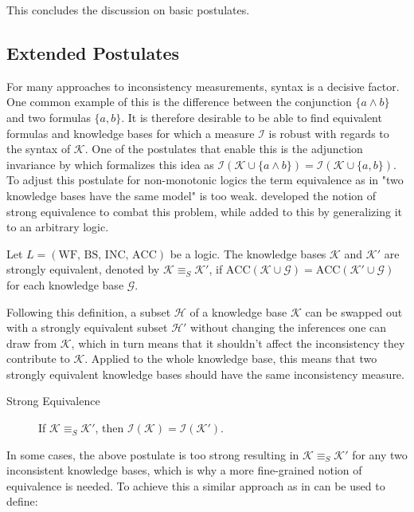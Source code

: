 This concludes the discussion on basic postulates.

\subsection{Extended Postulates}
For many approaches to inconsistency measurements, syntax is a decisive factor. One common example of this is the difference between the conjunction \(\{a \land b\}\) and two formulas \(\{a, b\}\). It is therefore desirable to be able to find equivalent formulas and knowledge bases for which a measure \(\mathcal{I}\) is robust with regards to the syntax of \(\mathcal{K}\). One of the postulates that enable this is the adjunction invariance by \cite{ferme_revisiting_2014} which formalizes this idea as \(\mathcal{I}(\mathcal{K} \cup \{a \land b\}) = \mathcal{I}(\mathcal{K} \cup \{a, b\})\).
To adjust this postulate for non-monotonic logics the term equivalence as in "two knowledge bases have the same model" is too weak. \cite{lifschitz_strongly_2001} developed the notion of strong equivalence to combat this problem, while \cite{brewka_strong_2019} added to this by generalizing it to an arbitrary logic.

\begin{definition}
    Let \(L = (\text{WF, BS, INC, ACC})\) be a logic. The knowledge bases \(\mathcal{K}\) and \(\mathcal{K}'\) are strongly equivalent, denoted by \(\mathcal{K} \equiv_S  \mathcal{K}'\), if \(\text{ACC}(\mathcal{K} \cup \mathcal{G}) = \text{ACC}(\mathcal{K}' \cup \mathcal{G})\) for each knowledge base \(\mathcal{G}\).
\end{definition}

Following this definition, a subset \(\mathcal{H}\) of a knowledge base \(\mathcal{K}\) can be swapped out with a strongly equivalent subset \(\mathcal{H}'\) without changing the inferences one can draw from \(\mathcal{K}\), which in turn means that it shouldn't affect the inconsistency they contribute to \(\mathcal{K}\). Applied to the whole knowledge base, this means that two strongly equivalent knowledge bases should have the same inconsistency measure.

\begin{description}
    \item[Strong Equivalence] If \(\mathcal{K} \equiv_S \mathcal{K}'\), then \(\mathcal{I}(\mathcal{K}) = \mathcal{I}(\mathcal{K}')\).
\end{description}

In some cases, the above postulate is too strong resulting in \(\mathcal{K} \equiv_S \mathcal{K}'\) for any two inconsistent knowledge bases, which is why a more fine-grained notion of equivalence is needed. To achieve this a similar approach as in \cite{thimm_inconsistency_2013} can be used to define:

